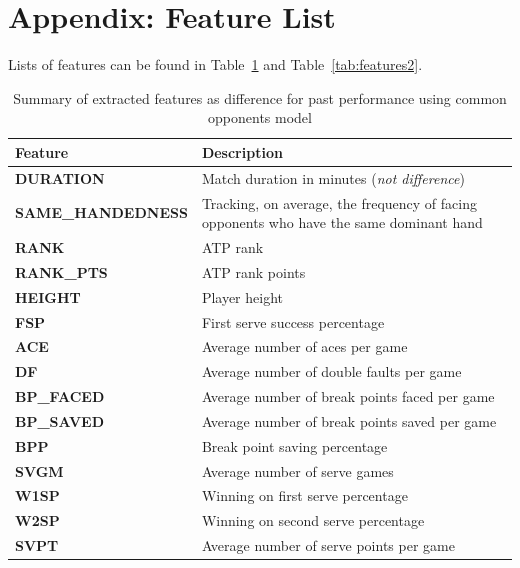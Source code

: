 \documentclass[paper=a4, fontsize=11pt]{scrartcl} %
\numberwithin{equation}{section} %
\numberwithin{figure}{section} %
\numberwithin{table}{section} %
\begin{document}
\section{Appendix: Feature List}
\label{sec:feat}
Lists of features can be found in Table~\ref{tab:features} and Table~\ref{tab:features2}. 
\begin{center}
\begin{table}[h]
    \begin{tabular}{  l | p{10cm} }
    \hline
    Feature  & Description \\ \hline
    \textbf{DURATION}  & Match duration in minutes (\textit{not difference}) \\ \hline
    \textbf{SAME\_HANDEDNESS}  & Tracking, on average, the frequency of facing opponents who have the same dominant hand \\ \hline
    \textbf{RANK}  & ATP rank \\ \hline
    \textbf{RANK\_PTS}  & ATP rank points \\ \hline
    \textbf{HEIGHT}  & Player height \\ \hline
    \textbf{FSP}  & First serve success percentage \\ \hline
    \textbf{ACE}  & Average number of aces per game \\ \hline
    \textbf{DF}  & Average number of double faults per game \\ \hline
    \textbf{BP\_FACED}  & Average number of break points faced per game \\ \hline
    \textbf{BP\_SAVED}  & Average number of break points saved per game \\ \hline
    \textbf{BPP}  & Break point saving percentage \\ \hline
    \textbf{SVGM}  & Average number of serve games \\ \hline
    \textbf{W1SP}  & Winning on first serve percentage \\ \hline
    \textbf{W2SP}  & Winning on second serve percentage \\ \hline
    \textbf{SVPT}  & Average number of serve points per game \\ \hline
    \end{tabular}
    \caption{Summary of extracted features as difference for past performance using common opponents model}
    \label{tab:features}
    \end{table}
\end{center}
\end{document}

